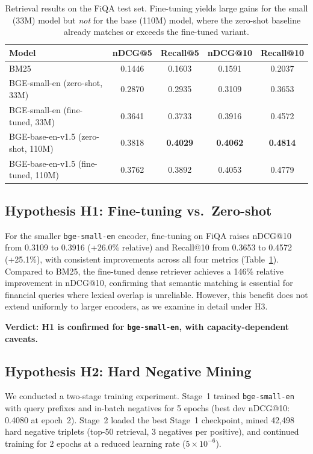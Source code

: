 \documentclass{article} %
\begin{document}
\begin{table}[t]
    \centering
    \scriptsize
    \begin{tabular}{lcccc}
        \toprule
        Model & nDCG@5 & Recall@5 & nDCG@10 & Recall@10 \\
        \midrule
        BM25 & 0.1446 & 0.1603 & 0.1591 & 0.2037 \\
        BGE-small-en (zero-shot, 33M) & 0.2870 & 0.2935 & 0.3109 & 0.3653 \\
        BGE-small-en (fine-tuned, 33M) & 0.3641 & 0.3733 & 0.3916 & 0.4572 \\
        BGE-base-en-v1.5 (zero-shot, 110M) & 0.3818 & \textbf{0.4029} & \textbf{0.4062} & \textbf{0.4814} \\
        BGE-base-en-v1.5 (fine-tuned, 110M) & 0.3762 & 0.3892 & 0.4053 & 0.4779 \\
        \bottomrule
    \end{tabular}
    \caption{Retrieval results on the FiQA test set. Fine-tuning yields large gains for the small (33M) model but \emph{not} for the base (110M) model, where the zero-shot baseline already matches or exceeds the fine-tuned variant.}
    \label{tab:main_results}
\end{table}

\subsection{Hypothesis H1: Fine-tuning vs.\ Zero-shot}

For the smaller \texttt{bge-small-en} encoder, fine-tuning on FiQA raises nDCG@10 from 0.3109 to 0.3916 (+26.0\% relative) and Recall@10 from 0.3653 to 0.4572 (+25.1\%), with consistent improvements across all four metrics (Table~\ref{tab:main_results}).
Compared to BM25, the fine-tuned dense retriever achieves a 146\% relative improvement in nDCG@10, confirming that semantic matching is essential for financial queries where lexical overlap is unreliable.
However, this benefit does not extend uniformly to larger encoders, as we examine in detail under H3.

\textbf{Verdict: H1 is confirmed for \texttt{bge-small-en}, with capacity-dependent caveats.}

\subsection{Hypothesis H2: Hard Negative Mining}
\label{sec:hn_analysis}

We conducted a two-stage training experiment.
Stage~1 trained \texttt{bge-small-en} with query prefixes and in-batch negatives for 5 epochs (best dev nDCG@10: 0.4080 at epoch~2).
Stage~2 loaded the best Stage~1 checkpoint, mined 42,498 hard negative triplets (top-50 retrieval, 3 negatives per positive), and continued training for 2 epochs at a reduced learning rate ($5 \times 10^{-6}$).
\end{document}
